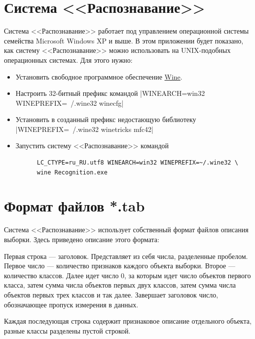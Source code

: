 \documentclass[12pt]{article}
\begin{document}
\appendix
\section{Система <<Распознавание>>}
Система <<Распознавание>> работает под управлением операционной
системы семейства Microsoft Windows XP и выше. В этом приложении будет
показано, как систему <<Распознавание>> можно использовать на
UNIX-подобных операционных системах. Для этого нужно:

\begin{itemize}
  \item Установить свободное программное обеспечение
    \href{https://www.winehq.org/}{Wine}.
  \item Настроить 32-битный префикс командой
    |WINEARCH=win32 WINEPREFIX=~/.wine32 winecfg|
  \item Установить в созданный префикс недостающую библиотеку
    |WINEPREFIX=~/.wine32 winetricks mfc42|
  \item Запустить систему <<Распознавание>> командой
    \begin{verbatim}
      LC_CTYPE=ru_RU.utf8 WINEARCH=win32 WINEPREFIX=~/.wine32 \
      wine Recognition.exe
    \end{verbatim}
\end{itemize}

\section{Формат файлов *.tab}

Система <<Распознавание>> использует собственный формат файлов
описания выборки. Здесь приведено описание этого формата:

Первая строка --- заголовок. Представляет из себя числа, разделенные
пробелом. Первое число --- количество признаков каждого объекта
выборки. Второе --- количество классов. Далее идет число \(0\), за
которым идет число объектов первого класса, затем сумма числа объектов
первых двух классов, затем сумма числа объектов первых трех классов и
так далее. Завершает заголовок число, обозначающее пропуск измерения в
данных.

Каждая последующая строка содержит признаковое описание отдельного
объекта, разные классы разделены пустой строкой.

\printbibliography
\end{document}
